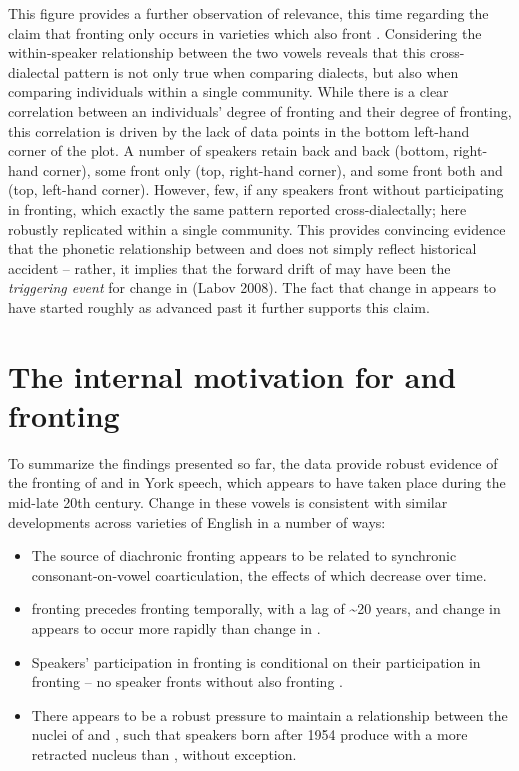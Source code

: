 \documentclass[12pt]{article}
\begin{document}
This figure provides a further observation of relevance, this time regarding the claim that  fronting only occurs in varieties which also front . Considering the within-speaker relationship between the two vowels reveals that this cross-dialectal pattern is not only true when comparing dialects, but also when comparing individuals within a single community.  While there is a clear correlation between an individuals' degree of  fronting and their degree of  fronting, this correlation is driven by the lack of data points in the bottom left-hand corner of the plot. A number of speakers retain back  and back  (bottom, right-hand corner), some front only  (top, right-hand corner), and some front both  and  (top, left-hand corner). However, few, if any speakers front  without participating in  fronting, which exactly the same pattern reported cross-dialectally; here robustly replicated within a single community. This provides convincing evidence that the phonetic relationship between  and  does not simply reflect historical accident -- rather, it implies that the forward drift of  may have been the \textit{triggering event} for change in   (Labov 2008). The fact that change in  appears to have started roughly as  advanced past it further supports this claim.

\section{The internal motivation for  and  fronting}
To summarize the findings presented so far, the data provide robust evidence of the fronting of  and  in York speech, which appears to have taken place during the mid-late 20th century. Change in these vowels is consistent with similar developments across varieties of English in a number of ways:

\begin{itemize}
\item{The source of diachronic  fronting appears to be related to synchronic consonant-on-vowel coarticulation, the effects of which decrease over time.}

\item{ fronting precedes  fronting temporally, with a lag of \textasciitilde20 years, and change in  appears to occur more rapidly than change in .}

\item{Speakers' participation in  fronting is conditional on their participation in  fronting -- no speaker fronts  without also fronting .}

\item{There appears to be a robust pressure to maintain a relationship between the nuclei of  and , such that speakers born after 1954 produce  with a more retracted nucleus than , without exception.}
\end{itemize}
\end{document}
